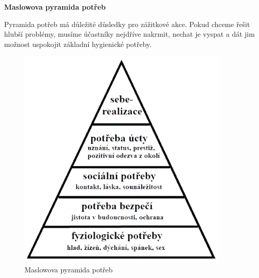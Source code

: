 \documentclass[a4paper,12pt,final]{report}
\begin{document}
\begin{samepage}

\vspace{1cm}
\textbf{Maslowova pyramida potřeb}

Pyramida potřeb má důležité důsledky pro zážitkové akce. Pokud chceme řešit hlubší problémy, musíme účastníky nejdříve nakrmit, nechat je vyspat a dát jim možnost uspokojit základní hygienické potřeby.
\begin{figure}
\pagelogos
\begin{center}
    \includegraphics[width=0.9\textwidth]{zdroje/maslowova-pyramida-lidskych-potreb.png}
    \caption{Maslowova pyramida potřeb}
\end{center} 
\end{figure}
\end{samepage}
\end{document}
